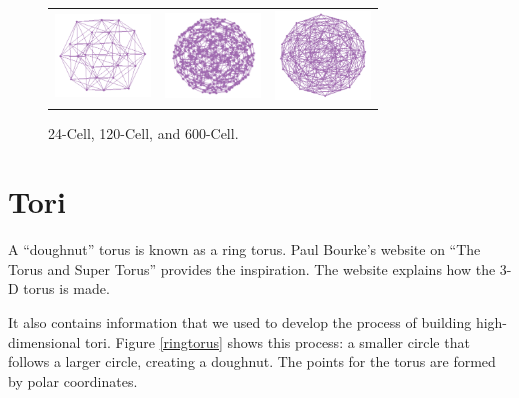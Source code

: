 \begin{figure}[ht]
\centering
\begin{tabular}{ccc}
\includegraphics[width=1.0in]{fig/24-cell.pdf}&\includegraphics[width=1in]{fig/120-cell.pdf}&\includegraphics[width=1in]{fig/600-cell.pdf}
\end{tabular}
\caption{24-Cell, 120-Cell, and 600-Cell.}
\label{polytope}
\end{figure}


\section{Tori}

A ``doughnut'' torus is known as a ring torus. Paul Bourke's website
\citep{Pa90} on ``The Torus and Super Torus'' provides the
inspiration. The website explains how the 3-D torus is made.

It also contains information that we used to develop the process of
building high-dimensional tori.  Figure \ref{ringtorus} shows this
process: a smaller circle that follows a larger circle, creating a
doughnut. The points for the torus are formed by polar coordinates.

